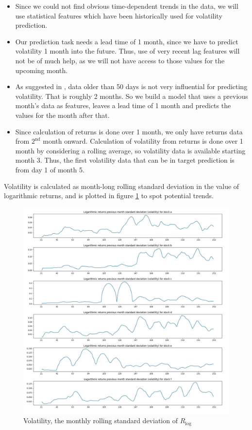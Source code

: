 \documentclass{article}
\begin{document}
\begin{itemize}
\item Since we could not find obvious time-dependent trends in the data, we will use statistical features which have been historically used for volatility prediction.
\item Our prediction task needs a lead time of 1 month, since we have to predict volatility 1 month into the future. Thus, use of very recent lag features will not be of much help, as we will not have access to those values for the upcoming month. 
\item As suggested in \cite{ghysels2006predicting}, data older than 50 days is not very influential for predicting volatility. That is roughly 2 months. So we build a model that uses a previous month's data as features, leaves a lead time of 1 month and predicts the values for the month after that.
\item Since calculation of returns is done over 1 month, we only have returns data from $2^\text{nd}$ month onward. 
Calculation of volatility from returns is done over 1 month by considering a rolling average, so volatility data is available starting month 3. Thus, the first volatility data that can be in target prediction is from day 1 of month 5.
\end{itemize}
Volatility is calculated as month-long rolling standard deviation in the value of logarithmic returns, and is plotted in figure \ref{fig7} to spot potential trends.

\begin{figure}[htb]
	\centering
	\includegraphics[width=\textwidth, height=0.67\textwidth]{volatility.jpg}
	\caption{Volatility, the monthly rolling standard deviation of $R_\text{log}$}
	\label{fig7}
\end{figure}
\end{document}
